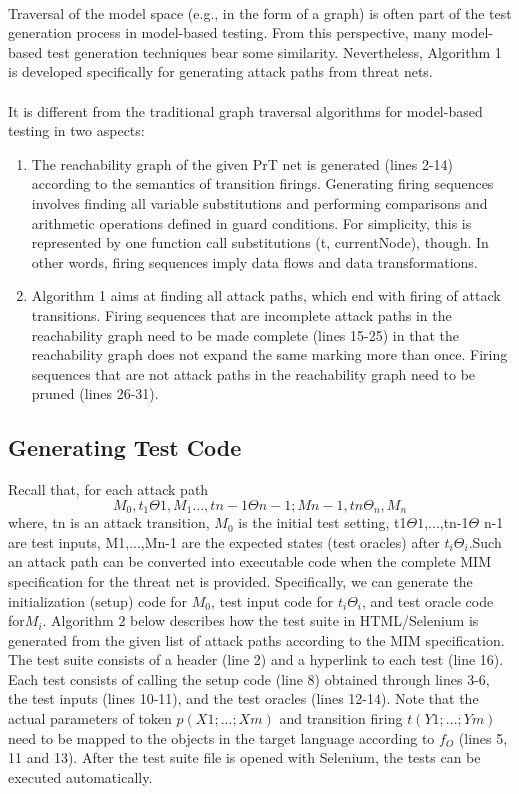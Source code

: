 \paragraph{}
Traversal of the model space (e.g., in the form of a graph)
is often part of the test generation process in model-based
testing. From this perspective, many model-based test
generation techniques bear some similarity. Nevertheless,
Algorithm 1 is developed specifically for generating attack
paths from threat nets. 
\\
\\
It is different from the traditional
graph traversal algorithms for model-based testing in
two aspects:
\begin{enumerate}
\item The reachability graph of the given PrT net
is generated (lines 2-14) according to the semantics of
transition firings. Generating firing
sequences involves finding all variable substitutions and
performing comparisons and arithmetic operations defined
in guard conditions. For simplicity, this is represented by one
function call substitutions (t, currentNode), though. In other
words, firing sequences imply data flows and data transformations.
\item Algorithm 1 aims at finding all attack
paths, which end with firing of attack transitions. Firing
sequences that are incomplete attack paths in the reachability
graph need to be made complete (lines 15-25) in that the
reachability graph does not expand the same marking more
than once. Firing sequences that are not attack paths in
the reachability graph need to be pruned (lines 26-31).
\end{enumerate}  
\subsection{Generating Test Code}
Recall that, for each attack path $$M_0,t_1\Theta1, M_1...,tn-1\Theta n-1;
Mn-1,tn\Theta_n,M_n$$where, tn is an attack transition, $M_0$ is the initial test setting, t1$\Theta1$,...,tn-1$\Theta$ n-1 are test inputs, M1,...,Mn-1 are the expected states (test oracles) after $t_i\Theta_i$.Such an attack path can be
converted into executable code when the complete MIM specification for the threat net is provided. Specifically, we can generate the initialization (setup) code for $M_0$, test input code for $t_i\Theta_i$, and test oracle code for$M_i$. Algorithm 2 below describes how the test suite in HTML/Selenium is generated from the given
list of attack paths according to the MIM specification. The test suite consists of a header (line 2) and a hyperlink to each test (line 16). Each test consists of calling the setup code (line 8) obtained through lines 3-6, the test inputs (lines 10-11), and the test oracles (lines 12-14). Note that the actual parameters of token $p(X1; . . .;Xm)$ and transition firing $t(Y1; . . . ; Ym)$ need to be mapped to the objects in the target language according to $f_O$ (lines 5, 11 and 13). After the test suite file is opened with Selenium, the tests can be executed automatically.
\newpage
